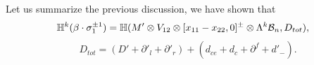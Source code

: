 \documentclass[10pt]{amsart}
\begin{document}


Let us summarize the previous discussion, we have shown that
\[\mathbb{H}^k(\beta\cdot\sigma_{1}^{\pm 1})=
\mathbb{H}(
M'\otimes V_{12}\otimes [x_{11}-x_{22},0]^{\pm}\otimes \Lambda^k\mathcal{B}_n,  D_{tot}),\]
\[\quad D_{tot}=(D'+\partial'_l+\partial'_r)+(d_{ce}+d_c+\partial^f+d'_-).
\]
\end{document}
